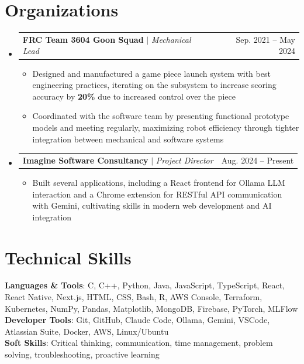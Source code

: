 \documentclass[letterpaper,11pt]{article}
\makeatletter
\newcommand{\resumeItem}[1]{
  \item\small{
    {#1 \vspace{-4pt}}
  }
}
\newcommand{\resumeProjectHeading}[2]{
    \item
    \begin{tabular*}{0.97\textwidth}{l@{\extracolsep{\fill}}r}
      \small#1 & #2 \\
    \end{tabular*}\vspace{-10pt}
}
\newcommand{\resumeSubHeadingListStart}{\begin{itemize}[leftmargin=0.15in, label={}]}
\newcommand{\resumeSubHeadingListEnd}{\end{itemize}}
\newcommand{\resumeItemListStart}{\begin{itemize}}
\newcommand{\resumeItemListEnd}{\end{itemize}\vspace{-5pt}}
\makeatother
\begin{document}
\section{Organizations}
  \resumeSubHeadingListStart

    \resumeProjectHeading
      {\textbf{FRC Team 3604 Goon Squad} $|$ \emph{Mechanical Lead}}{Sep. 2021 -- May 2024}
      \resumeItemListStart
        \resumeItem{Designed and manufactured a game piece launch system with best engineering practices, iterating on the subsystem to increase scoring accuracy by \textbf{20\%} due to increased control over the piece}
        \resumeItem{Coordinated with the software team by presenting functional prototype models and meeting regularly, maximizing robot efficiency through tighter integration between mechanical and software systems}
      \resumeItemListEnd

    \resumeProjectHeading
      {\textbf{Imagine Software Consultancy} $|$ \emph{Project Director}}{Aug. 2024 -- Present}
      \resumeItemListStart
        \resumeItem{Built several applications, including a React frontend for Ollama LLM interaction and a Chrome extension for RESTful API communication with Gemini, cultivating skills in modern web development and AI integration}
      \resumeItemListEnd

 \resumeSubHeadingListEnd
 
%
\section{Technical Skills}
 \begin{itemize}[leftmargin=0.15in, label={}]
    \small{\item{
     \textbf{Languages \& Tools}{: C, C++, Python, Java, JavaScript, TypeScript, React, React Native, Next.js, HTML, CSS, Bash, R, AWS Console, Terraform, Kubernetes, NumPy, Pandas, Matplotlib, MongoDB, Firebase, PyTorch, MLFlow} \\
     \textbf{Developer Tools}{: Git, GitHub, Claude Code, Ollama, Gemini, VSCode, Atlassian Suite, Docker, AWS, Linux/Ubuntu} \\
     \textbf{Soft Skills}{: Critical thinking, communication, time management, problem solving, troubleshooting, proactive learning} \\
    }}
 \end{itemize}


\end{document}
